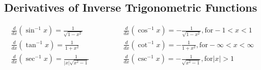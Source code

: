 %
%
%

\subsection{Derivatives of Inverse Trigonometric Functions}
\begin{align}
    \frac{d}{dx} \left(\sin^{-1} x \right) = \frac{1}{\sqrt{1 - x^2}} \qquad &\qquad \frac{d}{dx} \left( \cos^{-1} x \right) = -\frac{1}{\sqrt{1 - x^2}}, \text{for} -1 < x < 1 \\
    \frac{d}{dx} \left(\tan^{-1} x \right) = \frac{1}{1 + x^2} \qquad &\qquad \frac{d}{dx} \left( \cot^{-1} x \right) = -\frac{1}{1 + x^2}, \text{for} -\infty < x < \infty \\
    \frac{d}{dx} \left(\sec^{-1} x \right) = \frac{1}{|x|\sqrt{x^2- 1}} \qquad &\qquad \frac{d}{dx} \left( \csc^{-1} x \right) = -\frac{1}{\sqrt{x^2 - 1}}, \text{for} |x| > 1 \\
\end{align}
